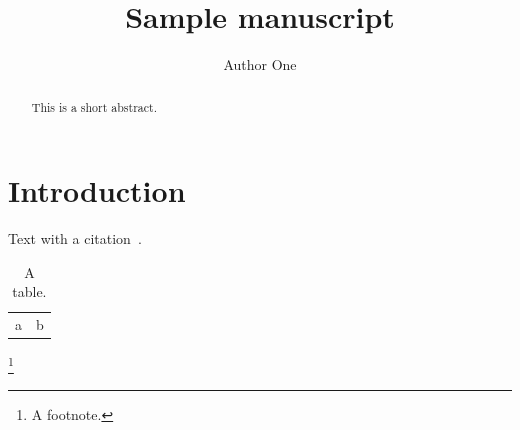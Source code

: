 \documentclass[10pt,letterpaper,twocolumn]{article}
\title{Sample manuscript}
\author{Author One}
\begin{document}
\maketitle
\begin{abstract}
This is a short abstract.
\end{abstract}
\section{Introduction}
Text with a citation~\cite{ref1}.
\begin{table}
\centering
\caption{A table.}
\begin{tabular}{cc}
a & b \\
\end{tabular}
\end{table}
\footnote{A footnote.}


\end{document}
